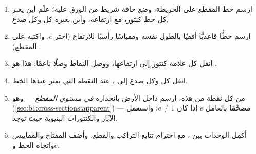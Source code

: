 \begin{method}\label{met:b1:cross-sections:construct}
\begin{enumerate}
  \item ارسم خط المقطع على الخريطة، وضع حافة شريط من الورق عليه؛ علّم أين يعبر كل خط كنتور، مع ارتفاعه، وأين يعبره كل  وكل صدع.
  \item ارسم خطًّا قاعديًّا أفقيًا بالطول نفسه ومقياسًا رأسيًا للارتفاع (اختر $e$، واكتبه على المقطع).
  \item انقل كل علامة كنتور إلى ارتفاعها، ووصل النقاط وصلًا ناعمًا: هذا هو .
  \item انقل كل  وكل صدع إلى ، عند النقطة التي يعبر عندها الخط.
  \item من كل نقطة من هذه، ارسم  داخل الأرض بانحداره \emph{في مستوي المقطع} --- وهو  (\cref{sec:b1:cross-sections:apparent}) --- مضخّمًا بالعامل $e$ إذا كان $e \ne 1$؛ واستعمل الآبار والكنتورات البنيوية حيث توجد.
  \item أكمِل الوحدات بين ، مع احترام تتابع التراكب والقطع، وأضف المفتاح والمقاييس واتجاه الخط و$e$.
\end{enumerate}
\end{method}

